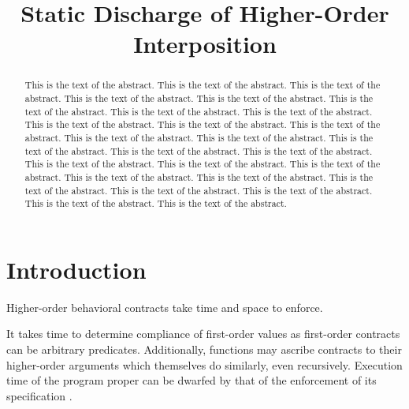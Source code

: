 \documentclass{sigplanconf}
\title{Static Discharge of Higher-Order Interposition}
\begin{document}
\newcommand{\chapcalc}[0]{\ensuremath{\lambda_{\mathcal{C}}}}



\maketitle

\begin{abstract}
This is the text of the abstract.
This is the text of the abstract.
This is the text of the abstract.
This is the text of the abstract.
This is the text of the abstract.
This is the text of the abstract.
This is the text of the abstract.
This is the text of the abstract.
This is the text of the abstract.
This is the text of the abstract.
This is the text of the abstract.
This is the text of the abstract.
This is the text of the abstract.
This is the text of the abstract.
This is the text of the abstract.
This is the text of the abstract.
This is the text of the abstract.
This is the text of the abstract.
This is the text of the abstract.
This is the text of the abstract.
This is the text of the abstract.
This is the text of the abstract.
This is the text of the abstract.
This is the text of the abstract.
This is the text of the abstract.
This is the text of the abstract.
\end{abstract}





% 

\section{Introduction}

Higher-order behavioral contracts take time and space to enforce.


It takes time to determine compliance of first-order values as first-order contracts can be arbitrary predicates.
Additionally, functions may ascribe contracts to their higher-order arguments which themselves do similarly, even recursively.
Execution time of the program proper can be dwarfed by that of the enforcement of its specification \cite{strickland2012chaperones}.
\end{document}
